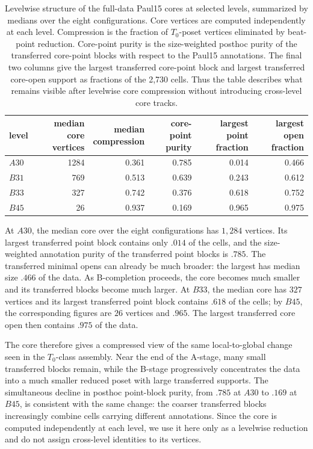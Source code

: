 \documentclass[a4paper,11pt]{article}
\theoremstyle{definition}
\theoremstyle{remark}
\begin{document}
\begin{table}[!ht]
\centering
\small
\caption{Levelwise structure of the full-data Paul15 cores at selected levels, summarized by medians over the eight configurations. Core vertices are computed independently at each level. Compression is the fraction of $T_0$-poset vertices eliminated by beat-point reduction. Core-point purity is the size-weighted posthoc purity of the transferred core-point blocks with respect to the Paul15 annotations. The final two columns give the largest transferred core-point block and largest transferred core-open support as fractions of the 2,730 cells. Thus the table describes what remains visible after levelwise core compression without introducing cross-level core tracks.}
\label{tab:paul15-core-structure}
\setlength{\tabcolsep}{3.8pt}
\begin{tabular}{@{}lrrrrr@{}}
\toprule
level & \shortstack{median\\core vertices} & \shortstack{median\\compression} & \shortstack{core-point\\purity} & \shortstack{largest point\\fraction} & \shortstack{largest open\\fraction} \\
\midrule
$A30$ & 1284 & 0.361 & 0.785 & 0.014 & 0.466 \\
$B31$ & 769 & 0.513 & 0.639 & 0.243 & 0.612 \\
$B33$ & 327 & 0.742 & 0.376 & 0.618 & 0.752 \\
$B45$ & 26 & 0.937 & 0.169 & 0.965 & 0.975 \\
\bottomrule
\end{tabular}
\end{table}

At $A30$, the median core over the eight configurations has $1{,}284$ vertices. Its largest transferred point block contains only $.014$ of the cells, and the size-weighted annotation purity of the transferred point blocks is $.785$. The transferred minimal opens can already be much broader: the largest has median size $.466$ of the data. As B-completion proceeds, the core becomes much smaller and its transferred blocks become much larger. At $B33$, the median core has $327$ vertices and its largest transferred point block contains $.618$ of the cells; by $B45$, the corresponding figures are $26$ vertices and $.965$. The largest transferred core open then contains $.975$ of the data.

The core therefore gives a compressed view of the same local-to-global change seen in the $T_0$-class assembly. Near the end of the A-stage, many small transferred blocks remain, while the B-stage progressively concentrates the data into a much smaller reduced poset with large transferred supports. The simultaneous decline in posthoc point-block purity, from $.785$ at $A30$ to $.169$ at $B45$, is consistent with the same change: the coarser transferred blocks increasingly combine cells carrying different annotations. Since the core is computed independently at each level, we use it here only as a levelwise reduction and do not assign cross-level identities to its vertices.
\end{document}

